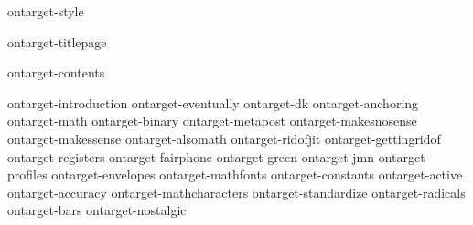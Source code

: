 
\environment ontarget-style

\dontcomplain

\startdocument

    \component ontarget-titlepage

    \startfrontmatter
        \component ontarget-contents
    \stopfrontmatter

    \startbodymatter
        \component ontarget-introduction
        \component ontarget-eventually
        \component ontarget-dk
        \component ontarget-anchoring
        \component ontarget-math
        \component ontarget-binary
        \component ontarget-metapost
        \component ontarget-makesnosense
        \component ontarget-makessense
        \component ontarget-alsomath
        \component ontarget-ridofjit
        \component ontarget-gettingridof
        \component ontarget-registers
        \component ontarget-fairphone
        \component ontarget-green
        \component ontarget-jmn
        \component ontarget-profiles
        \component ontarget-envelopes
        \component ontarget-mathfonts
        \component ontarget-constants
        \component ontarget-active
        \component ontarget-accuracy
        \component ontarget-mathcharacters
        \component ontarget-standardize
        \component ontarget-radicals
        \component ontarget-bars
        \component ontarget-nostalgic
    \stopbodymatter

\stopdocument

